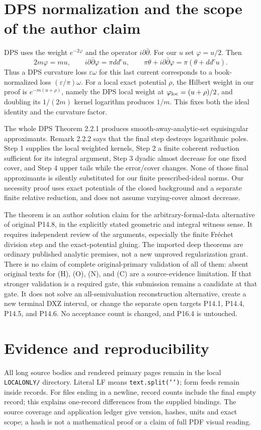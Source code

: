 \documentclass[11pt]{article}
\theoremstyle{definition}
\begin{document}
\section{DPS normalization and the scope of the author claim}
DPS uses the weight $e^{-2\varphi}$ and the operator
$i\partial\bar\partial$. For our $u$ set $\varphi=u/2$.
Then
\[
 2m\varphi=mu,\qquad
 i\partial\bar\partial\varphi=\pi dd^cu,\qquad
 \pi\theta+i\partial\bar\partial\varphi
       =\pi(\theta+dd^cu).
\]
Thus a DPS curvature loss $\varepsilon\omega$ for this last
current corresponds to a book-normalized loss
$(\varepsilon/\pi)\omega$. For a local exact potential $\rho$,
the Hilbert weight in our proof is $e^{-m(u+\rho)}$, namely
the DPS local weight at $\varphi_{\rm loc}=(u+\rho)/2$,
and doubling its $1/(2m)$ kernel logarithm produces $1/m$.
This fixes both the ideal identity and the curvature factor.

The whole DPS Theorem 2.2.1 produces smooth-away-analytic-set
equisingular approximants. Remark 2.2.2 says that the final
step destroys logarithmic poles. Step 1 supplies the local
weighted kernels, Step 2 a finite coherent reduction sufficient
for its integral argument, Step 3 dyadic almost decrease for
one fixed cover, and Step 4 upper tails while the error/cover
changes. None of those final approximants is silently substituted
for our finite prescribed-ideal norms. Our necessity proof uses
exact potentials of the closed background and a separate finite
relative reduction, and does not assume varying-cover almost
decrease.

The theorem is an author solution claim for the arbitrary-formal-data
alternative of original P14.8, in the explicitly stated geometric
and integral witness sense. It requires independent review of
the arguments, especially the finite Fr\'echet division step and
the exact-potential gluing. The imported deep theorems are ordinary
published analytic premises, not a new unproved regularization
grant. There is no claim of complete original-primary validation
of all of them: absent original texts for (H), (O), (N), and (C)
are a source-evidence limitation. If that stronger validation is
a required gate, this submission remains a candidate at that gate.
It does not solve an all-semivaluation reconstruction alternative,
create a new terminal DXZ interval, or change the separate open
targets P14.1, P14.4, P14.5, and P14.6. No acceptance count is
changed, and P16.4 is untouched.

\appendix
\section{Evidence and reproducibility}
All long source bodies and rendered primary pages remain in the
local \texttt{LOCALONLY/} directory. Literal LF means
\texttt{text.split('\string\n')}; form feeds remain inside records.
For files ending in a newline, record counts include the final
empty record; this explains one-record differences from the
supplied bindings. The source coverage and application ledger
give version, hashes, units and exact scope; a hash is not a
mathematical proof or a claim of full PDF visual reading.
\end{document}

